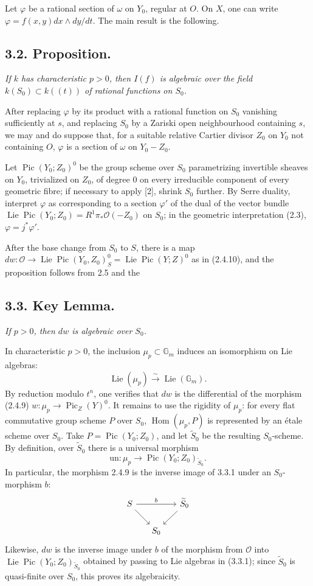 \documentclass[11pt,leqno]{article}
\DeclareMathOperator{\Lie}{Lie}
\DeclareMathOperator{\Pic}{Pic}
\DeclareMathOperator{\Hom}{Hom}
\newcommand{\OO}{\mathcal O}
\newcommand{\GG}{\mathbb G}
\begin{document}
Let $\varphi$ be a rational section of $\omega$ on $Y_0$, regular at $O$. On $X$, one can write $\varphi=f(x,y)dx\wedge dy/dt$. The main result is the following.

\subsection*{3.2. Proposition.}
\emph{If $k$ has characteristic $p>0$, then $I(f)$ is algebraic over the field $k(S_0)\subset k((t))$ of rational functions on $S_0$.}

After replacing $\varphi$ by its product with a rational function on $S_0$ vanishing sufficiently at $s$, and replacing $S_0$ by a Zariski open neighbourhood containing $s$, we may and do suppose that, for a suitable relative Cartier divisor $Z_0$ on $Y_0$ not containing $O$, $\varphi$ is a section of $\omega$ on $Y_0-Z_0$.

Let $\Pic(Y_0;Z_0)^0$ be the group scheme over $S_0$ parametrizing invertible sheaves on $Y_0$, trivialized on $Z_0$, of degree 0 on every irreducible component of every geometric fibre; if necessary to apply [2], shrink $S_0$ further. By Serre duality, interpret $\varphi$ as corresponding to a section $\varphi'$ of the dual of the vector bundle $\Lie\Pic(Y_0;Z_0)=R^1\pi_*\OO(-Z_0)$ on $S_0$; in the geometric interpretation (2.3), $\varphi=j^*\varphi'$.

After the base change from $S_0$ to $S$, there is a map $dw:\OO\to\Lie\Pic(Y_0,Z_0)^0_S=\Lie\Pic(Y;Z)^0$ as in (2.4.10), and the proposition follows from 2.5 and the

\subsection*{3.3. Key Lemma.}
\emph{If $p>0$, then $dw$ is algebraic over $S_0$.}

In characteristic $p>0$, the inclusion $\mu_p\subset\GG_m$ induces an isomorphism on Lie algebras:
\[
        \Lie(\mu_p)\xrightarrow{\sim}\Lie(\GG_m).
\]
By reduction modulo $t^n$, one verifies that $dw$ is the differential of the morphism (2.4.9) $w:\mu_p\to\Pic_Z(Y)^0$. It remains to use the rigidity of $\mu_p$: for every flat commutative group scheme $P$ over $S_0$, $\Hom(\mu_p,P)$ is represented by an étale scheme over $S_0$. Take $P=\Pic(Y_0;Z_0)$, and let $\widetilde S_0$ be the resulting $S_0$-scheme. By definition, over $\widetilde S_0$ there is a universal morphism
\begin{equation}
        \mathrm{un}:\mu_p\longrightarrow\Pic(Y_0;Z_0)_{\widetilde S_0}. \tag{3.3.1}
\end{equation}
In particular, the morphism 2.4.9 is the inverse image of 3.3.1 under an $S_0$-morphism $b$:
\[
\begin{tikzcd}[column sep=1.4em,row sep=1.6em]
S \arrow[rr,"b"] \arrow[dr] & & \widetilde S_0 \arrow[dl] \\
& S_0 &
\end{tikzcd}
\]
Likewise, $dw$ is the inverse image under $b$ of the morphism from $\OO$ into $\Lie\Pic(Y_0;Z_0)_{\widetilde S_0}$ obtained by passing to Lie algebras in (3.3.1); since $\widetilde S_0$ is quasi-finite over $S_0$, this proves its algebraicity.
\clearpage
\end{document}
